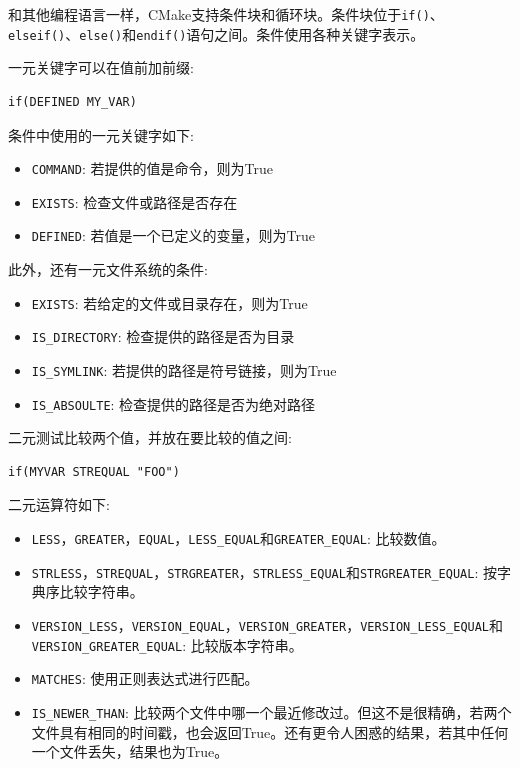 和其他编程语言一样，CMake支持条件块和循环块。条件块位于\texttt{if()}、\texttt{elseif()}、\texttt{else()}和\texttt{endif()}语句之间。条件使用各种关键字表示。

一元关键字可以在值前加前缀:

\begin{lstlisting}[style=styleCMake]
if(DEFINED MY_VAR)
\end{lstlisting}

条件中使用的一元关键字如下:

\begin{itemize}
\item 
\texttt{COMMAND}: 若提供的值是命令，则为True

\item 
\texttt{EXISTS}: 检查文件或路径是否存在

\item 
\texttt{DEFINED}: 若值是一个已定义的变量，则为True
\end{itemize}

此外，还有一元文件系统的条件:

\begin{itemize}
\item 
\texttt{EXISTS}: 若给定的文件或目录存在，则为True

\item 
\texttt{IS\_DIRECTORY}: 检查提供的路径是否为目录

\item 
\texttt{IS\_SYMLINK}: 若提供的路径是符号链接，则为True

\item 
\texttt{IS\_ABSOULTE}: 检查提供的路径是否为绝对路径
\end{itemize}

二元测试比较两个值，并放在要比较的值之间:

\begin{lstlisting}[style=styleCMake]
if(MYVAR STREQUAL "FOO")
\end{lstlisting}

二元运算符如下:

\begin{itemize}
\item 
\texttt{LESS}，\texttt{GREATER}，\texttt{EQUAL}，\texttt{LESS\_EQUAL}和\texttt{GREATER\_EQUAL}: 比较数值。

\item 
\texttt{STRLESS}，\texttt{STREQUAL}，\texttt{STRGREATER}，\texttt{STRLESS\_EQUAL}和\texttt{STRGREATER\_EQUAL}: 按字典序比较字符串。

\item 
\texttt{VERSION\_LESS}，\texttt{VERSION\_EQUAL}，\texttt{VERSION\_GREATER}，\texttt{VERSION\_LESS\_EQUAL}和\texttt{VERSION\_GREATER\_EQUAL}: 比较版本字符串。

\item 
\texttt{MATCHES}: 使用正则表达式进行匹配。

\item 
\texttt{IS\_NEWER\_THAN}: 比较两个文件中哪一个最近修改过。但这不是很精确，若两个文件具有相同的时间戳，也会返回True。还有更令人困惑的结果，若其中任何一个文件丢失，结果也为True。
\end{itemize}

